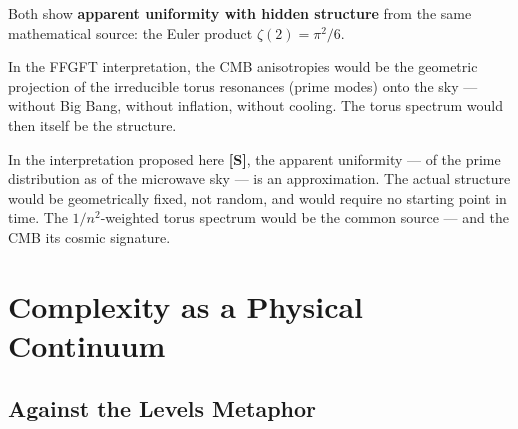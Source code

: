 \begin{interpretation}
Both show \textbf{apparent uniformity with hidden structure} from the
same mathematical source: the Euler product $\zeta(2) = \pi^2/6$.

In the FFGFT interpretation, the CMB anisotropies would be the geometric projection of the
irreducible torus resonances (prime modes) onto the sky — without Big
Bang, without inflation, without cooling. The torus spectrum would then
itself be the structure.
\end{interpretation}

\begin{table}[ht]
\centering
{}
\caption{Primes and CMB anisotropies as possible instances of the same eternal spectrum [S]}
\end{table}

In the interpretation proposed here \textbf{[S]}, the apparent uniformity — of the
prime distribution as of the microwave sky — is an approximation. The actual structure
would be geometrically fixed, not random, and would require no starting point in time.
The $1/n^2$-weighted torus spectrum would be the common source — and the CMB
its cosmic signature.
\section{Complexity as a Physical Continuum}

\subsection{Against the Levels Metaphor}

